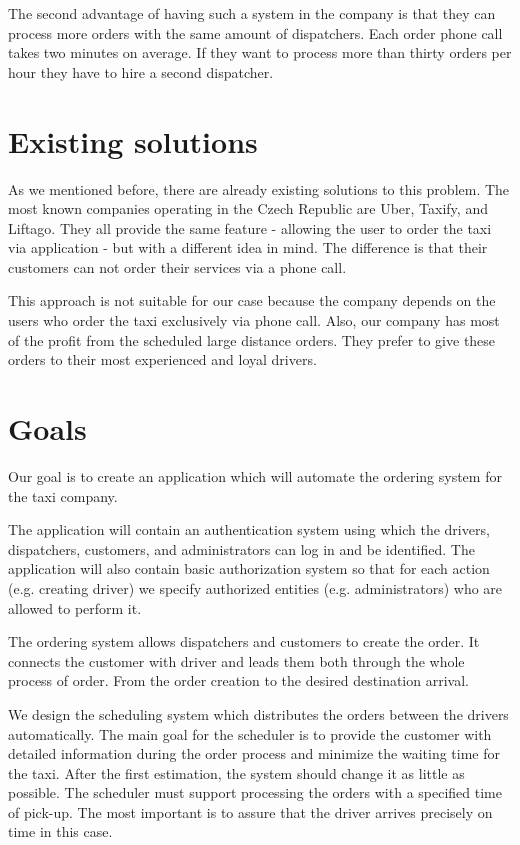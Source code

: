The second advantage of having such a system in the company is that they can process more orders with the same amount of dispatchers. Each order phone call takes two minutes on average. If they want to process more than thirty orders per hour they have to hire a second dispatcher.


\section{Existing solutions}
As we mentioned before, there are already existing solutions to this problem. The most known companies operating in the Czech Republic are Uber, Taxify, and Liftago. They all provide the same feature - allowing the user to order the taxi via application - but with a different idea in mind. The difference is that their customers can not order their services via a phone call. 

This approach is not suitable for our case because the company depends on the users who order the taxi exclusively via phone call. Also, our company has most of the profit from the scheduled large distance orders. They prefer to give these orders to their most experienced and loyal drivers. 

\section{Goals}

Our goal is to create an application which will automate the ordering system for the taxi company.

The application will contain an authentication system using which the drivers, dispatchers, customers, and administrators can log in and be identified. The application will also contain basic authorization system so that for each action (e.g. creating driver) we specify authorized entities (e.g. administrators) who are allowed to perform it.

The ordering system allows dispatchers and customers to create the order. It connects the customer with driver and leads them both through the whole process of order. From the order creation to the desired destination arrival. 

We design the scheduling system which distributes the orders between the drivers automatically. The main goal for the scheduler is to provide the customer with detailed information during the order process and minimize the waiting time for the taxi. After the first estimation, the system should change it as little as possible. The scheduler must support processing the orders with a specified time of pick-up. The most important is to assure that the driver arrives precisely on time in this case.

